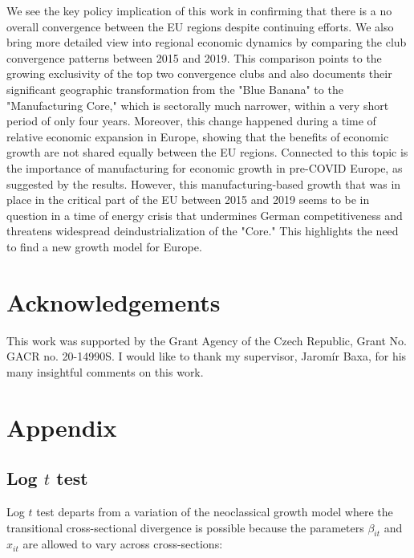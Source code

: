 \documentclass[11pt]{article}
\begin{document}
We see the key policy implication of this work in confirming that there is a no overall convergence between the EU regions despite continuing efforts. We also bring more detailed view into regional economic dynamics by comparing the club convergence patterns between 2015 and 2019. This comparison points to the growing exclusivity of the top two convergence clubs and also documents their significant geographic transformation from the "Blue Banana" to the "Manufacturing Core," which is sectorally much narrower, within a very short period of only four years. Moreover, this change happened during a time of relative economic expansion in Europe, showing that the benefits of economic growth are not shared equally between the EU regions. Connected to this topic is the importance of manufacturing for economic growth in pre-COVID Europe, as suggested by the results. However, this manufacturing-based growth that was in place in the critical part of the EU between 2015 and 2019 seems to be in question in a time of energy crisis that undermines German competitiveness and threatens widespread deindustrialization of the "Core." This highlights the need to find a new growth model for Europe.

\section{Acknowledgements} 
This work was supported by the Grant Agency of the Czech Republic, Grant No. GACR no. 20-14990S. I would like to thank my supervisor, Jaromír Baxa, for his many insightful comments on this work.


\newpage


\appendix
\section{Appendix}
\setcounter{table}{0}
\renewcommand{\thetable}{A\arabic{table}}
\renewcommand{\thefigure}{A\arabic{figure}}
\setcounter{figure}{0}

\subsection{Log $t$ test}

Log $t$ test departs from a variation of the neoclassical growth model where the transitional cross-sectional divergence is possible because the parameters $\beta_{it}$ and $x_{it}$ are allowed to vary across cross-sections:
\end{document}
